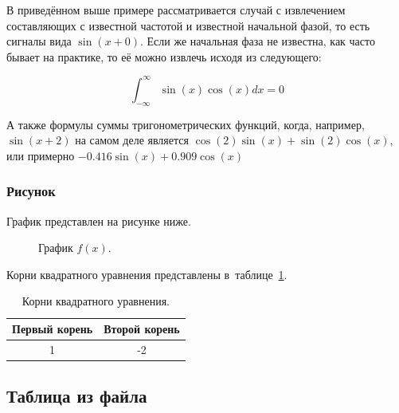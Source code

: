\documentclass[rusmathsym, eqnumwithinsec, amspack, hyperref]{bomgost}
\begin{document}
В приведённом выше примере рассматривается случай с извлечением составляющих с известной частотой и известной начальной фазой, то есть сигналы вида $\sin(x+0)$. Если же начальная фаза не известна, как часто бывает на практике, то её можно извлечь исходя из следующего:

\begin{equation}
	\int_{-\infty}^{\infty}{\sin(x)\cos(x)}{dx}=0
\end{equation}

А также формулы суммы тригонометрических функций, когда, например, $\sin(x+2)$ на самом деле является $\cos(2)\sin(x) + \sin(2)\cos(x)$, или примерно $-0.416\sin(x) + 0.909\cos(x)$

\subsubsection{Рисунок}
График представлен на рисунке ниже.
\begin{gostfigure}
\begin{figure}[H]
\centering
{}
\caption{График \(f(x)\).}
\end{figure}
\end{gostfigure}

Корни квадратного уравнения представлены в~таблице~\ref{tab:roots}.
\begin{gosttable}
\begin{table}[H]
\centering
\caption{Корни квадратного уравнения.}
\label{tab:roots}
\begin{tabular}{|c|c|}
\hline 
Первый корень &  Второй корень \\ 
\hline 
1 & -2  \\ 
\hline 
\end{tabular}
\end{table}
\end{gosttable}

\subsection{Таблица из файла}
\end{document}

